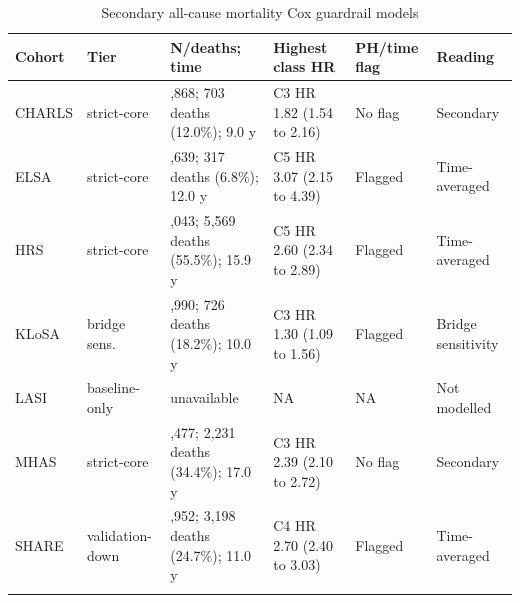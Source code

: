 \documentclass[pdflatex,sn-vancouver-num]{sn-jnl}
\begin{document}
\begin{table}[!htbp]
\singlespacing
\caption{Secondary all-cause mortality Cox guardrail models}\label{tab:mortality-secondary}
\scriptsize
\setlength{\tabcolsep}{3pt}
\begin{tabular}{@{}>{\raggedright\arraybackslash}p{}>{\raggedright\arraybackslash}p{}>{\raggedright\arraybackslash}p{}>{\raggedright\arraybackslash}p{}>{\raggedright\arraybackslash}p{}>{\raggedright\arraybackslash}p{}@{}}
\toprule
Cohort & Tier & N/deaths; time & Highest class HR & PH/time flag & Reading\\
\midrule
CHARLS & strict-core & 5,868; 703 deaths (12.0\%); 9.0 y & C3 HR 1.82 (1.54 to 2.16) & No flag & Secondary\\
ELSA & strict-core & 4,639; 317 deaths (6.8\%); 12.0 y & C5 HR 3.07 (2.15 to 4.39) & Flagged & Time-averaged\\
HRS & strict-core & 10,043; 5,569 deaths (55.5\%); 15.9 y & C5 HR 2.60 (2.34 to 2.89) & Flagged & Time-averaged\\
KLoSA & bridge sens. & 3,990; 726 deaths (18.2\%); 10.0 y & C3 HR 1.30 (1.09 to 1.56) & Flagged & Bridge sensitivity\\
LASI & baseline-only & unavailable & NA & NA & Not modelled\\
MHAS & strict-core & 6,477; 2,231 deaths (34.4\%); 17.0 y & C3 HR 2.39 (2.10 to 2.72) & No flag & Secondary\\
SHARE & validation-down & 12,952; 3,198 deaths (24.7\%); 11.0 y & C4 HR 2.70 (2.40 to 3.03) & Flagged & Time-averaged\\
\botrule
\end{tabular}
\end{table}
\end{document}
